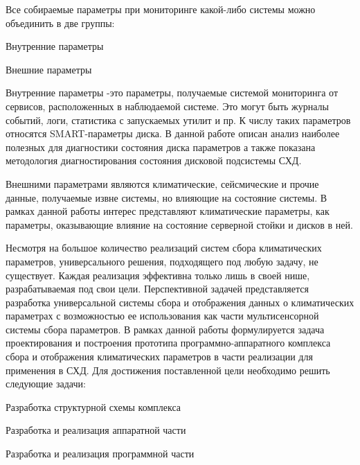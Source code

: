 Все собираемые параметры при мониторинге какой-либо системы можно объединить в две группы: 
\begin{itemize*}
	\item{Внутренние параметры}
	\item{Внешние параметры}
\end{itemize*}	

Внутренние параметры -это параметры, получаемые системой мониторинга от сервисов, расположенных в наблюдаемой системе. Это могут быть журналы событий, логи, статистика с запускаемых утилит и пр. К числу таких параметров относятся SMART-параметры диска. В данной работе описан анализ наиболее полезных для диагностики состояния диска параметров а также показана методология диагностирования состояния дисковой подсистемы СХД.

Внешними параметрами являются климатические, сейсмические и прочие данные, получаемые извне системы, но влияющие на состояние системы. В рамках данной работы интерес представляют климатические параметры, как параметры, оказывающие влияние на состояние серверной стойки и дисков в ней. 

Несмотря на большое количество реализаций систем сбора климатических параметров, универсального решения, подходящего под любую задачу, не существует. Каждая реализация эффективна только лишь в своей нише, разрабатываемая под свои цели. Перспективной задачей представляется разработка универсальной системы сбора и отображения данных о климатических параметрах с возможностью ее использования как части мультисенсорной системы сбора параметров.  В рамках данной работы формулируется задача проектирования и построения прототипа программно-аппаратного комплекса сбора и отображения климатических параметров в части реализации для применения в СХД. 
Для достижения поставленной цели необходимо решить следующие задачи:
\begin{itemize*}
	\item{Разработка структурной схемы комплекса}
	\item{Разработка и реализация аппаратной части}
	\item{Разработка и реализация программной части}
\end{itemize*}	

